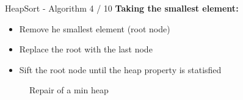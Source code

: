 \documentclass[notes=hide,pdftex,14pt]{beamer}
\newcommand{\currentred}{red!70!gray}
\begin{document}

\begin{frame}{HeapSort - Algorithm 4 / 10}
  \textbf{Taking the smallest element:}
  \begin{itemize}
    \item
      Remove he smallest element (root node)
    \item
      Replace the root with the last node
    \item
      {\color{Mittel-Blau}Sift} the root node until the
      {\color{Mittel-Blau}heap property} is statisfied
  \end{itemize}
  \begin{figure}[!h]%
    \begin{columns}%
      \begin{column}{0.3\textwidth}%
        \begin{adjustbox}{width=\linewidth}
\onslide<1>{\rlap{\renewcommand{\currentred}{Mittel-Blau}}}%
%
        \end{adjustbox}%
      \end{column}%
      \hspace*{0.05em}%
      \begin{column}{0.3\textwidth}%
        \begin{adjustbox}{width=\linewidth}
\onslide<3>{\rlap{\renewcommand{\currentred}{Mittel-Blau}}}%
%
        \end{adjustbox}
      \end{column}%
      \hspace*{0.05em}%
      \begin{column}{0.3\textwidth}%
        \begin{adjustbox}{width=\linewidth}
%
        \end{adjustbox}%
      \end{column}%
    \end{columns}%
    \caption{Repair of a min heap}%
    \label{fig:minheap_repair}%
  \end{figure}
\end{frame}

\end{document}
